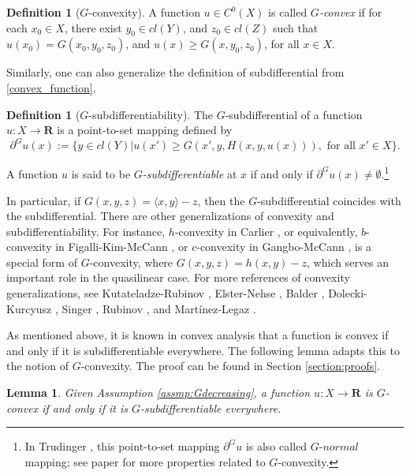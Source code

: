 \documentclass[a4paper, 11pt]{amsart}
\numberwithin{equation}{section}
\theoremstyle{plain}
\newtheorem{lemma}[theorem]{Lemma}
\theoremstyle{definition}
\newtheorem{definition}[theorem]{Definition}
\theoremstyle{remark}
\newcommand{\R}{\mathbf{R}}
\begin{document}
\begin{definition}[$G$-convexity]
	A function $u\in C^0(X)$ is called {\it $G$-convex} if for each $x_0 \in X$, there exist $y_0 \in   cl(Y)$, and $z_0 \in  cl(Z)$ such that $u(x_0)=G(x_0, y_0, z_0)$, and $u(x)\ge G(x, y_0, z_0)$, for all $x\in X$.
\end{definition}


Similarly, one can also generalize the definition of subdifferential from \eqref{convex_function}.

\begin{definition}[$G$-subdifferentiability]
	The $G$-subdifferential of a 
	function $u: X \longrightarrow \R$ is a point-to-set mapping defined by
	\begin{equation*}
	\partial^G u(x):= \{ y\in  cl(Y)| u(x')\ge G(x',y, H(x,y,u(x))), \text{ for all } x'\in X\}.
	\end{equation*}
	
	A function $u$ is said to be {\it $G$-subdifferentiable} at $x$ if and only if $\partial^G u(x) \neq \emptyset$.\footnote{In Trudinger \cite{Trudinger14}, this point-to-set mapping $\partial^G u$ is also called $G$-$normal$ mapping; see paper for more properties related to $G$-convexity.}
\end{definition}




In particular, if $G(x,y,z) = \langle x, y \rangle - z$, then the $G$-subdifferential coincides with the subdifferential. There are other generalizations of convexity and subdifferentiability. For instance, $h$-convexity in Carlier \cite{Carlier01}, or equivalently, $b$-convexity in Figalli-Kim-McCann \cite{FigalliKimMcCann11}, or $c$-convexity in  Gangbo-McCann \cite{GangboMcCann96}, is a special form of $G$-convexity, where $G(x,y,z)=  h(x,y) -z$, which serves an important role in the quasilinear case. For more references of convexity generalizations, see Kutateladze-Rubinov \cite{KutateladzeRubinov72}, Elster-Nehse \cite{ElsterNehse74}, Balder \cite{Balder77}, Dolecki-Kurcyusz \cite{DoleckiKurcyusz78},  Singer \cite{Singer97},  Rubinov \cite{Rubinov00a}, and Martínez-Legaz \cite{MartinezLegaz05}.\medskip


As mentioned above, it is known in convex analysis that a function is convex if and only if it is subdifferentiable everywhere. The following lemma adapts this to the notion of $G$-convexity. The proof can be found in Section \ref{section:proofs}.

\begin{lemma}\label{convex-subdiff}
	Given Assumption \ref{assmp:Gdecreasing}, a function $u: X \longrightarrow \R$ is $G$-convex if and only if it is $G$-subdifferentiable everywhere.
\end{lemma}
\end{document}
